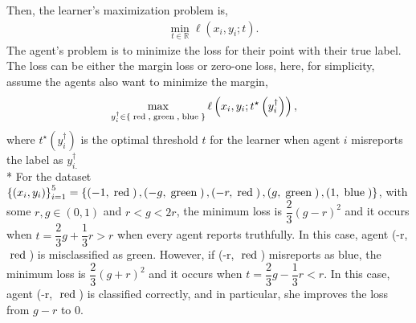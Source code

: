 \documentclass{article}
\begin{document}
Then, the learner's maximization problem is,
\begin{align*}
&\displaystyle\min_{t \in \mathbb{R}} \ell\left(x_{i}, y_{i}; t\right).
\end{align*}
The agent's problem is to minimize the loss for their point with their true label. The loss can be either the margin loss or zero-one loss, here, for simplicity, assume the agents also want to minimize the margin,
\begin{align*}
&\displaystyle\max_{y^{\dagger}_{i} \in \left\{\text{\;red\;}, \text{\;green\;}, \text{\;blue\;}\right\}} \ell\left(x_{i}, y_{i}; t^\star \left(y^{\dagger}_{i}\right)\right),
\end{align*}
where $t^\star \left(y^{\dagger}_{i}\right)$ is the optimal threshold $t $ for the learner when agent $i $ misreports the label as $y^{\dagger}_{i.}$
\\* For the dataset $\left\{\left(x_{i}, y_{i}\right)\right\}_{i=1}^{5} = \left\{\left(-1, \text{\;red\;}\right), \left(-g, \text{\;green\;}\right), \left(-r, \text{\;red\;}\right), \left(g, \text{\;green\;}\right), \left(1, \text{\;blue\;}\right)\right\}$, with some $r , g \in \left(0, 1\right)$ and $r  < g < 2 r $, the minimum loss is $\dfrac{2}{3} \left(g - r\right)^{2}$ and it occurs when $t  = \dfrac{2}{3} g + \dfrac{1}{3} r > r $ when every agent reports truthfully. In this case, agent (-r, $\text{\;red\;}$) is misclassified as green. However, if (-r, $\text{\;red\;}$) misreports as blue, the minimum loss is $\dfrac{2}{3} \left(g + r\right)^{2}$ and it occurs when $t  = \dfrac{2}{3} g - \dfrac{1}{3} r < r $. In this case, agent (-r, $\text{\;red\;}$) is classified correctly, and in particular, she improves the loss from $g  - r $ to $0$.
\newline \newline

\begin{figure}[H] \centering {} \label{fig:1dat}
\end{figure}
\end{document}
